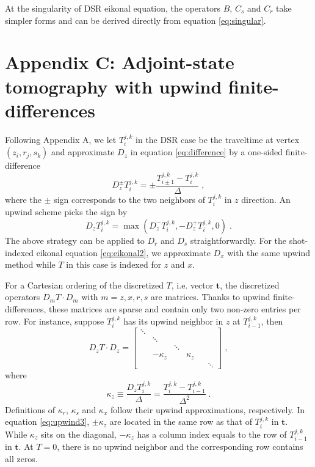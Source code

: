 At the singularity of DSR eikonal equation, the operators $B$, $C_s$ and $C_r$ take simpler forms 
and can be derived directly from equation \ref{eq:singular}.

\appendix
\section{Appendix C: Adjoint-state tomography with upwind finite-differences}

Following Appendix A, we let $T_i^{j,k}$ in the DSR case be the traveltime at vertex $(z_i,r_j,s_k)$ and 
approximate $D_z$ in equation \ref{eq:difference} by a one-sided finite-difference
\begin{equation}
\label{eq:upwind1}
D_z^{\pm} T_i^{j,k} = 
\pm \frac{T_{i \pm 1}^{j,k} - T_i^{j,k}}{\Delta}\;,
\end{equation}
where the $\pm$ sign corresponds to the two neighbors of $T_i^{j,k}$ in $z$ direction. An upwind scheme 
\cite[]{franklin} picks the sign by
\begin{equation}
\label{eq:upwind2}
D_z T_i^{j,k} = 
\max \left( D_z^- T_i^{j,k}, -D_z^+ T_i^{j,k}, 0 \right)\;.
\end{equation}
The above strategy can be applied to $D_r$ and $D_s$ straightforwardly. For the shot-indexed eikonal equation 
\ref{eq:eikonal2}, we approximate $D_x$ with the same upwind method while $T$ in this case is indexed for $z$ 
and $x$.

For a Cartesian ordering of the discretized $T$, i.e. vector $\mathbf{t}$, the discretized operators 
$D_m T \cdot D_m$ with $m = z,x,r,s$ are matrices. Thanks to upwind finite-differences, these matrices are 
sparse and contain only two non-zero entries per row. For instance, suppose $T_i^{j,k}$ has 
its upwind neighbor in $z$ at $T_{i-1}^{j,k}$, then 
\begin{equation}
\label{eq:upwind3}
D_z T \cdot D_z = \left[
\begin{array}{cccccc}
\ddots & & & & & \\
& \ddots & & & & \\
& & \ddots & & & \\
& -\kappa_z & & \kappa_z & & \\
& & & & & \ddots
\end{array} \right]\;,
\end{equation}
where
\begin{equation}
\label{eq:kappa}
\kappa_z \equiv  \frac{D_z T_i^{j,k}}{\Delta} = \frac{T_i^{j,k} - T_{i-1}^{j,k}}{\Delta^2}\;.
\end{equation}
Definitions of $\kappa_r$, $\kappa_s$ and $\kappa_x$ follow their upwind approximations, respectively. In 
equation \ref{eq:upwind3}, $\pm \kappa_z$ are located in the same row as that of $T_i^{j,k}$ in $\mathbf{t}$. 
While $\kappa_z$ sits on the diagonal, $- \kappa_z$ has a column index equals to the row of $T_{i-1}^{j,k}$ in 
$\mathbf{t}$. At $T = 0$, there is no upwind neighbor and the corresponding row contains 
all zeros.
 
